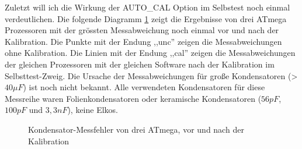 Zuletzt will ich die Wirkung der AUTO\_CAL Option im Selbstest noch einmal verdeutlichen.
Die folgende Diagramm \ref{fig:MegaAuto} zeigt die Ergebnisse von drei ATmega Prozessoren 
mit der grössten Messabweichung noch einmal vor und nach der Kalibration.
Die Punkte mit der Endung ,,unc'' zeigen die Messabweichungen ohne Kalibration.
Die Linien mit der Endung ,,cal'' zeigen die Messabweichungen der gleichen Prozessoren
mit der gleichen Software nach der Kalibration im Selbsttest-Zweig.
Die Ursache der Messabweichungen für große Kondensatoren (\textgreater\(40 \mu F\)) ist
noch nicht bekannt. Alle verwendeten Kondensatoren für diese Messreihe waren
Folienkondensatoren oder keramische Kondensatoren (\(56 pF\), \(100 pF\) und \(3,3 nF\)), keine Elkos.

\begin{figure}[H]
\centering

\caption{Kondensator-Messfehler von drei ATmega, vor und nach der Kalibration}
\label{fig:MegaAuto}
\end{figure}
